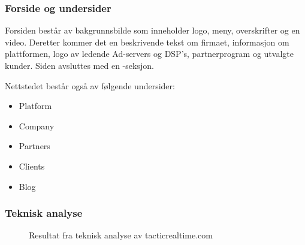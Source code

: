 \subsubsection{Forside og undersider}

Forsiden består av bakgrunnsbilde som inneholder logo, meny, overskrifter og en video.  
Deretter kommer det en beskrivende tekst om firmaet, informasjon om plattformen, logo av ledende  Ad-servers og DSP's, partnerprogram og utvalgte kunder. Siden avsluttes med en -seksjon.

Nettstedet består også av følgende undersider:
\begin{itemize}
\item Platform
\item Company
\item Partners
\item Clients
\item Blog
\end{itemize}

\subsubsection{Teknisk analyse}

\begin{figure}[H]
    \begin{center}
        
        \label{fig:competitors-tech_analysis-tacticrealtime.com}
        \caption{Resultat fra teknisk analyse av tacticrealtime.com}
    \end{center}
\end{figure}

